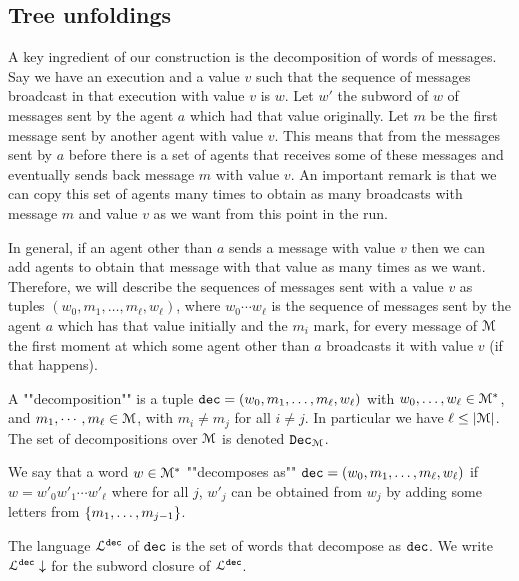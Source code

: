 \subsection{Tree unfoldings}
\label{sec:decidability-tree-unfoldings}

A key ingredient of our construction is the decomposition of words of messages. Say we have an execution and a value $v$ such that the sequence of messages broadcast in that execution with value $v$ is $w$. Let $w'$ the subword of $w$ of messages sent by the agent $a$ which had that value originally. Let $m$ be the first message sent by another agent with value $v$. This means that from the messages sent by $a$ before there is a set of agents that receives some of these messages and eventually sends back message $m$ with value $v$. An important remark is that we can copy this set of agents many times to obtain as many broadcasts with message $m$ and value $v$ as we want from this point in the run.

In general, if an agent other than $a$ sends a message with value $v$ then we can add agents to obtain that message with that value as many times as we want.
Therefore, we will describe the sequences of messages sent with a value $v$ as tuples $(w_0, m_1, \ldots, m_\ell, w_\ell)$, where $w_0 \cdots w_\ell$ is the sequence of messages sent by the agent $a$ which has that value initially and the $m_i$ mark, for every message of $\mathcal{M}$ the first moment at which some agent other than $a$ broadcasts it with value $v$ (if that happens).


\begin{definition}
	A ""decomposition"" is a tuple $\mathtt{dec} = (w_0, m_1, \ldots, m_\ell, w_\ell)$ with $w_0, \ldots, w_\ell \in \mathcal{M}^*$, and $m_1, \cdots, m_\ell \in \mathcal{M}$, with $m_i \neq m_j$ for all $i\neq j$. In particular we have $\ell \leq |\mathcal{M}|$. The set of decompositions over $\mathcal{M}$ is denoted $\mathtt{Dec}_{\mathcal{M}}$.
	
	We say that a word $w \in \mathcal{M}^*$ ""decomposes as"" $\mathtt{dec} = (w_0, m_1, \ldots, m_\ell, w_\ell)$ if $w = w'_0 w'_1 \cdots w'_\ell$ where for all $j$, $w'_j$ can be obtained from $w_j$ by adding some letters from $\{m_1, \ldots, m_{j-1}\}$.
	
	The language $\mathcal{L}^{\mathtt{\mathtt{dec}}}$ of $\mathtt{dec}$ is the set of words that decompose as $\mathtt{dec}$. We write $\mathcal{L}^{\mathtt{\mathtt{dec}}}\downarrow$ for the subword closure of $\mathcal{L}^{\mathtt{\mathtt{dec}}}$.
\end{definition}



